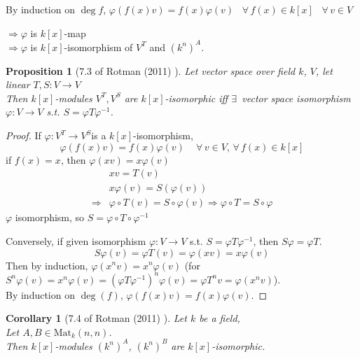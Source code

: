 \documentclass[10pt]{amsart}
\newtheorem{corollary}{Corollary}
\newtheorem{proposition}{Proposition}
\begin{document}
\begin{multicols*}{2}
\begin{enumerate}
	By induction on $\deg{f}$, $\varphi(f(x)v) = f(x) \varphi(v)$ \quad \, $\forall \, f(x) \in k[x]$ \quad \, $\forall \, v \in V$ 
	
	$\Longrightarrow \varphi$ is $k[x]$-map \\
	$\Longrightarrow \varphi$ is $k[x]$-isomorphism of $V^T$ and $(k^n)^A$.  
	
\end{enumerate}


\begin{proposition}[7.3 of Rotman (2011) \cite{JRotman2010}]\label{Prop:kxmoduleisomorphism}
	Let vector space over field $k$, $V$, let linear $T,S : V \to V$ \\
	Then $k[x]$-modules $V^T, V^S$ are $k[x]$-isomorphic iff $\exists \, $ vector space isomorphism $\varphi : V \to V$ s.t. $S = \varphi T \varphi^{-1}$.  
\end{proposition}

\begin{proof}
	If $\varphi:V^T \to V^S$is a $k[x]$-isomorphism, 
	\[
	\varphi(f(x)v) = f(x)\varphi(v) \quad \, \forall \, v \in V , \, \forall \, f(x) \in k[x]
	\]
	if $f(x)=x$, then $\varphi(xv) = x\varphi(v)$
	\[
	\begin{aligned}
	& xv = T(v) \\ 
	& x\varphi(v) = S(\varphi(v)) \\ 
	\Longrightarrow & \varphi \circ T(v) = S \circ \varphi(v) \Longrightarrow \varphi \circ T = S \circ \varphi 
	\end{aligned}
	\]
	$\varphi$ isomorphism, so $S = \varphi \circ T \circ \varphi^{-1}$
	
	Conversely, if given isomorphism $\varphi: V \to V$ s.t. $S = \varphi T \varphi^{-1}$, then $S\varphi = \varphi T$.  
	\[
	S\varphi(v) = \varphi T(v) = \varphi(xv) = x\varphi(v)
	\]
	Then by induction, $\varphi(x^nv) = x^n\varphi(v)$ (for $S^n\varphi(v) = x^n\varphi(v) = (\varphi T \varphi^{-1})^n \varphi(v) = \varphi T^n v = \varphi(x^nv)$).  \\
	By induction on $\deg{(f)}$, $\varphi(f(x)v) = f(x)\varphi(v)$.  
	
	
\end{proof}



\begin{corollary}[7.4 of Rotman (2011) \cite{JRotman2010}] 
	Let $k$ be a field, \\
	Let $A,B \in \text{Mat}_k(n,n)$.  \\
	Then $k[x]$-modules $(k^n)^A$, $(k^n)^B$ are $k[x]$-isomorphic.  
	

\end{corollary}
\end{multicols*}
\end{document}
